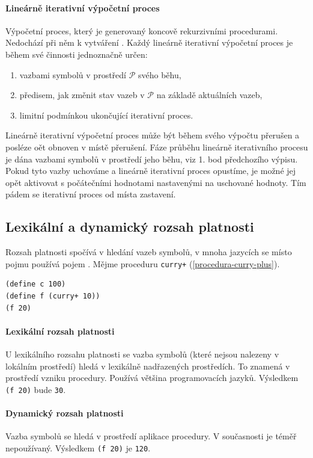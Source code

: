 \documentclass[10pt,a4paper]{article}
\begin{document}
    \paragraph{Lineárně iterativní výpočetní proces}
      Výpočetní proces, který je generovaný koncově rekurzivními procedurami. Nedochází při něm k vytváření . Každý lineárně iterativní výpočetní proces je během své činnosti jednoznačně určen:
      \begin{enumerate}
        \item vazbami symbolů v prostředí $\mathcal{P}$ svého běhu,
        \item předisem, jak změnit stav vazeb v $\mathcal{P}$ na základě aktuálních vazeb,
        \item limitní podmínkou ukončující iterativní proces.
      \end{enumerate}
      Lineárně iterativní výpočetní proces může být během svého výpočtu přerušen a posléze oět obnoven v místě přerušení. Fáze průběhu lineárně iterativního procesu je dána vazbami symbolů v prostředí jeho běhu, viz 1. bod předchozího výpisu. Pokud tyto vazby uchováme a lineárně iterativní proces opustíme, je možné jej opět aktivovat s počátečními hodnotami nastavenými na uschované hodnoty. Tím pádem se iterativní proces  od místa zastavení.
  \subsection{Lexikální a dynamický rozsah platnosti}
    Rozsah platnosti spočívá v hledání vazeb symbolů, v mnoha jazycích se místo pojmu  používá pojem . Mějme proceduru \texttt{curry+} (\ref{procedura-curry-plus}).
    \begin{verbatim}
(define c 100)
(define f (curry+ 10))
(f 20)
    \end{verbatim}
    \paragraph{Lexikální rozsah platnosti}
      U lexikálního rozsahu platnosti se vazba symbolů (které nejsou nalezeny v lokálním prostředí) hledá v lexikálně nadřazených prostředích. To znamená v prostředí vzniku procedury. Používá většina programovacích jazyků. Výsledkem \texttt{(f 20)} bude \texttt{30}.
    \paragraph{Dynamický rozsah platnosti}
      Vazba symbolů se hledá v prostředí aplikace procedury. V současnosti je téměř nepoužívaný. Výsledkem \texttt{(f 20)} je \texttt{120}.
\end{document}
